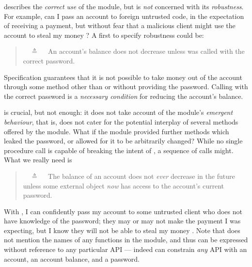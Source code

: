     \vspace{.05in}
 
\Scorrect  describes  {the \emph{correct use} of the module, but is \emph{not} concerned with its \emph{robustness}.}
{For example, can I pass an account to foreign untrusted code, in the expectation of receiving a payment,
but without fear that a malicious client might use the account to steal my money \cite{ELang}?}
 A first  to specify robustness could be:
 

\begin{quote}
\SrobustA\ \ $\triangleq$ \ \ An account's balance does not decrease unless  was called 
with the correct password.
\end{quote}

Specification \SrobustA %
{guarantees} that it is not possible to  take money out of the account through some method other than 
{or without providing the password}.
  Calling    with the  correct password is 
a \emph{necessary condition} for reducing the account's  balance.

\SrobustA is  crucial, but  not   enough:
it does not take  account of the module's \emph{emergent behaviour},
{that is, does not cater for the potential interplay of several methods offered by the module.}
 What if the module provided further methods which leaked the password,  
 {or allowed for it to be arbitrarily changed}?
{ While no single procedure call is capable of breaking the intent of \SrobustA, a sequence of calls might.}
{What} we really need is
 \begin{quote}
\SrobustB\ \ $\triangleq$ \ \ The balance of an account does not {\emph{ever}} decrease in the future unless some external 
object  {\emph{now}} has access to the account's current password.
\end{quote}
With \SrobustB, I can confidently pass my account to some untrusted client who
 does not have
 knowledge of the password; they may or may not make the payment I was expecting, but I
 know they will not  {be able to} steal my money \cite{ooToSecurity,miller-esop2013}.
 Note that \SrobustB  does not mention
 the names of any functions in the module, and 
 thus can be expressed without reference to any particular API ---
 indeed \SrobustB can constrain \emph{any} API with an account, an account
 balance, and a password.


